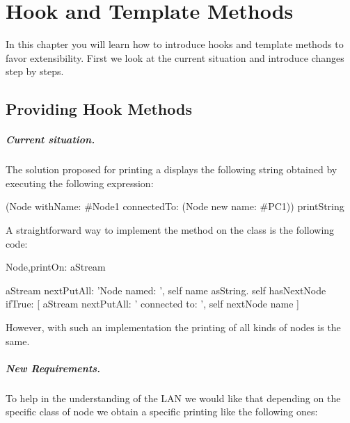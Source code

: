 
\ifx\wholebook\relax\else


\fi

\chapter{ Hook and Template Methods}


In this chapter you will learn how to introduce hooks and template methods to favor extensibility. First we look at the current situation and introduce changes step by steps.

\section{Providing Hook Methods}

\paragraph{Current situation.} The solution proposed for printing a  displays the following string  obtained by executing the following expression:

\begin{scode}
(Node withName: \#Node1 connectedTo: (Node new name: \#PC1)) printString
\end{scode}

A straightforward way to implement the  method on the  class  is the following code:

\begin{scode}
Node\sep{}printOn: aStream

    aStream nextPutAll: 'Node named: ', self name asString.
    self hasNextNode 
        ifTrue: [ aStream nextPutAll: ' connected to: ', self nextNode name ]
\end{scode}

However, with such an implementation the printing of all kinds of nodes is the same.

\paragraph{New Requirements.}
To help in the understanding of the LAN we would like that depending on the specific class of node we obtain a specific printing like the following ones:

